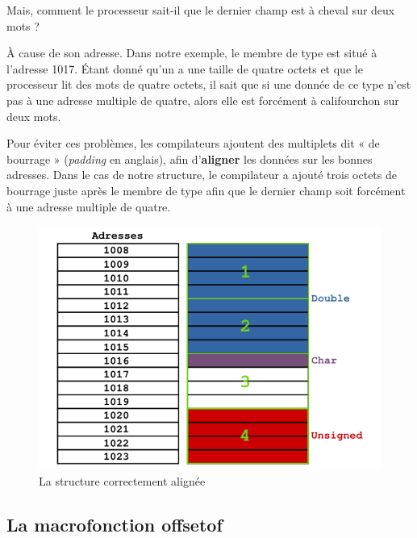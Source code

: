\begin{questionbox}
Mais, comment le processeur sait-il que le dernier champ est à cheval sur deux mots ?
\end{questionbox}


À cause de son adresse. Dans notre exemple, le membre de type
 est situé à l'adresse 1017. Étant donné qu'un
 a une taille de quatre octets et que le
processeur lit des mots de quatre octets, il sait que si une donnée de
ce type n'est pas à une adresse multiple de quatre, alors elle est
forcément à califourchon sur deux mots.

Pour éviter ces problèmes, les compilateurs ajoutent des multiplets dit
« de bourrage » (\emph{padding} en anglais), afin d'\textbf{aligner} les
données sur les bonnes adresses. Dans le cas de notre structure, le
compilateur a ajouté trois octets de bourrage juste après le membre de
type  afin que le dernier champ soit forcément à une
adresse multiple de quatre.

\begin{figure}[htbp]
\centering
\includegraphics[scale=0.5]{images/structure_correct_align.png}
\caption{La structure correctement alignée}
\end{figure}

\subsection{La macrofonction offsetof}
\label{la-macrofonction-offsetof}

